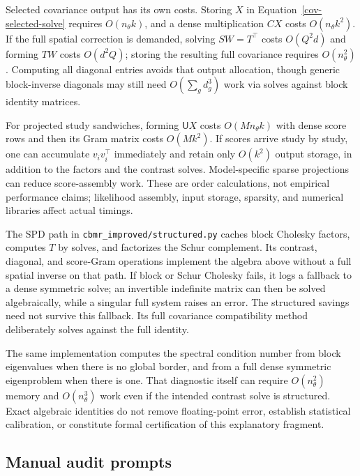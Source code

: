 Selected covariance output has its own costs.  Storing $X$ in
Equation~\eqref{cov-selected-solve} requires $O(n_\theta k)$,
and a dense multiplication $CX$ costs $O(n_\theta k^2)$.
If the full spatial correction is demanded, solving
$SW=T^\top$ costs $O(Q^2d)$ and forming $TW$ costs $O(d^2Q)$;
storing the resulting full covariance requires $O(n_\theta^2)$.
Computing all diagonal entries avoids that output allocation, though
generic block-inverse diagonals may still need
$O(\sum_gd_g^3)$ work via solves against block identity matrices.

For projected study sandwiches, forming $\mathsf U X$ costs
$O(Mn_\theta k)$ with dense score rows and then its Gram matrix
costs $O(Mk^2)$.  If scores arrive study by study, one can accumulate
$v_iv_i^\top$ immediately and retain only $O(k^2)$ output storage,
in addition to the factors and the contrast solves.  Model-specific
sparse projections can reduce score-assembly work.  These are order
calculations, not empirical performance claims; likelihood assembly,
input storage, sparsity, and numerical libraries affect actual timings.

The SPD path in \texttt{cbmr\_improved/structured.py} caches block
Cholesky factors, computes $T$ by solves, and factorizes the Schur
complement.  Its contrast, diagonal, and score-Gram operations implement
the algebra above without a full spatial inverse on that path.
If block or Schur Cholesky fails, it logs a fallback to a dense symmetric
solve; an invertible indefinite matrix can then be solved algebraically,
while a singular full system raises an error.  The structured savings
need not survive this fallback.  Its full covariance compatibility
method deliberately solves against the full identity.

The same implementation computes the spectral condition number from
block eigenvalues when there is no global border, and from a full
dense symmetric eigenproblem when there is one.  That diagnostic itself
can require $O(n_\theta^2)$ memory and $O(n_\theta^3)$ work even if
the intended contrast solve is structured.  Exact algebraic identities
do not remove floating-point error, establish statistical calibration,
or constitute formal certification of this explanatory fragment.

\subsection{Manual audit prompts}
\label{cov-manual-audit}

